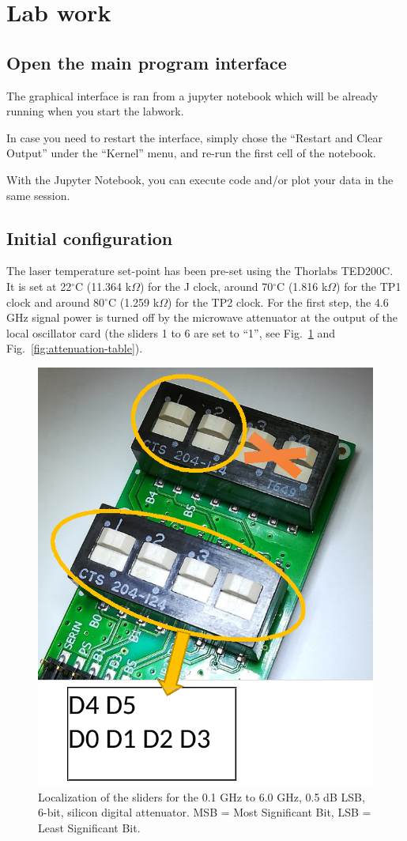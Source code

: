 \documentclass[a4paper,11pt]{article}
\begin{document}
\section{Lab work}
\subsection{Open the main program interface}
The graphical interface is ran from a jupyter notebook which will be already running when you start the labwork. 

In case you need to restart the interface, simply chose the “Restart and Clear Output” under the “Kernel” menu, and re-run the first cell of the notebook.

With the Jupyter Notebook, you can execute code and/or plot your data in the same session.

\subsection{Initial configuration}
The laser temperature set-point has been pre-set using the Thorlabs TED200C. It is set at 22$^\circ$C (11.364 k$\Omega$) for the J clock, around 70$^\circ$C (1.816 k$\Omega$) for the TP1 clock and around 80$^\circ$C (1.259 k$\Omega$) for the TP2 clock.
For the first step, the 4.6 GHz signal power is turned off by the microwave attenuator at the output of the local oscillator card (the sliders 1 to 6 are set to “1”, see Fig.~\ref{fig:attenuation} and Fig.~\ref{fig:attenuation-table}).



\begin{figure}[h!]
	\centering
	\includegraphics[width=0.5\linewidth]{attenuation}
	\caption{Localization of the sliders for the 0.1 GHz to 6.0 GHz, 0.5 dB LSB, 6-bit, silicon digital attenuator. MSB = Most Significant Bit, LSB = Least Significant Bit.}
	\label{fig:attenuation}
\end{figure}
\end{document}
